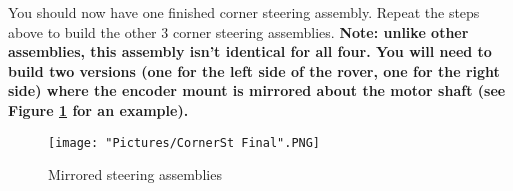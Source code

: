 \documentclass[12pt]{article}
\begin{document}
\begin{enumerate}
You should now have one finished corner steering assembly. Repeat the 
steps above to build the other 3 corner steering assemblies. \textbf{Note: unlike other assemblies, this assembly 
isn't identical for all four. You will need to build two versions (one for the left side of the rover, one for the right side) where the encoder mount is mirrored about 
the motor shaft (see Figure \ref{corner steering 5} for an example).}

\begin{figure}[H]
  \centering
  \begin{minipage}[b]{0.45\textwidth}
    \texttt{[image: "Pictures/CornerSt Final".PNG]}
  \end{minipage}
  \caption{Mirrored steering assemblies}
  \label{corner steering 5}
\end{figure}

\end{enumerate}
\end{document}
